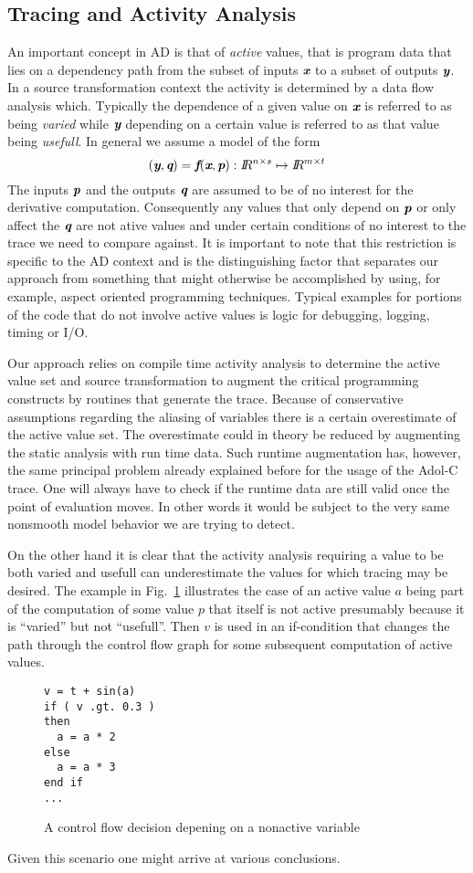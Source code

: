 \documentclass{article}
\newcommand{\R}{I\!\!R}
\newcommand{\bmf}{\mbox{\bf\em f}}
\newcommand{\bmp}{\mbox{\bf\em p}}
\newcommand{\bmq}{\mbox{\bf\em q}}
\newcommand{\bmx}{\mbox{\bf\em x}}
\newcommand{\bmy}{\mbox{\bf\em y}}
\newcommand{\reffig}[1]{{Fig.~\ref{#1}}}
\begin{document}
\subsection{Tracing and Activity Analysis}
An important concept in AD is that of {\em active} values, that is 
program data that lies on a dependency path from the subset of inputs $\bmx$ to 
a subset of outputs $\bmy$. 
In a source transformation context the activity is determined by a data flow 
analysis which. Typically the dependence of a given value on $\bmx$ is 
referred to as being {\em varied} while $\bmy$ depending on 
a certain value is referred to as that value being {\em usefull}.   
In general we assume a model of the form 
\[
(\bmy,\bmq)=\bmf(\bmx,\bmp): \R^{n\times s}\mapsto \R^{m\times t}
\]
The inputs $\bmp$ and the outputs $\bmq$  are assumed to be of no interest 
for the derivative computation. Consequently any values that only depend on
$\bmp$ or only affect the $\bmq$ are not ative values and  
under certain conditions of no interest to the trace we need to compare against. 
It is important to note that this restriction is specific to the AD context 
and is the distinguishing factor that separates our  approach  
from something that might otherwise be accomplished 
by using, for example, aspect oriented programming techniques. 
Typical examples for portions of the code that do not involve active values 
is logic for debugging, logging, timing or I/O.   

Our approach relies on compile time activity analysis to determine the active value set 
and source transformation to augment the critical programming constructs by 
routines that generate the trace. 
Because of conservative assumptions regarding the 
aliasing of variables there is a certain overestimate of the active value set. 
The overestimate could in theory be reduced by augmenting the static analysis 
with run time data. 
Such runtime augmentation has,  however,  the same principal problem already 
explained before for the usage of the Adol-C trace. 
One will always have to check 
if the runtime data are still valid once the point of evaluation moves. 
In other words it would be subject to the very same nonsmooth model behavior we are trying to detect.

On the other hand it is clear that the activity  analysis requiring a value 
to be both varied and usefull can underestimate 
the values for which tracing may be desired. 
The example in \reffig{fig:missedThis} illustrates the case of an active value  $a$
being part of the computation of some value $p$ that itself is not active presumably 
because it is ``varied'' but not ``usefull''.
Then $v$ is used in an if-condition that changes the path through the control flow 
graph for some  subsequent computation of active values.
\begin{figure}
\begin{lstlisting}
v = t + sin(a) 
if ( v .gt. 0.3 )
then 
  a = a * 2
else
  a = a * 3
end if 
...
\end{lstlisting}
\caption{A control flow decision depening on a nonactive variable}\label{fig:missedThis} 
\end{figure}
Given this scenario one might arrive at various conclusions. 
\end{document}
